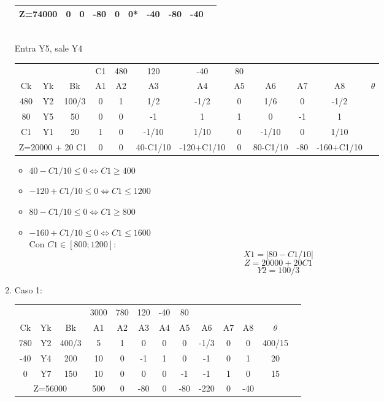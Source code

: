 \documentclass{article}
\begin{document}
\begin{enumerate}
\begin{tabular}{|c  c  c | c  c  c  c  c  c  c  c | c |}
			 \multicolumn{3}{|c|}{Z=74000} & 0 & 0 & -80 & 0 & 0* & -40 & -80 & -40 &\\ \hline
		\end{tabular}
		\medskip\\
		Entra Y5, sale Y4\\
		\begin{tabular}{|c  c  c | c  c  c  c  c  c  c  c | c |}
			\hline
			 \multicolumn{3}{|c|}{} & C1 & 480 & 120 & -40 & 80 & & & &\\ 
			 Ck & Yk & Bk & A1 & A2 & A3 & A4 & A5 & A6 & A7 & A8 & $\theta$\\ \hline 
			 480 & Y2 & 100/3 & 0 & 1 & 1/2 & -1/2 & 0 & 1/6 & 0 & -1/2 & \\
			 80 & Y5 & 50 & 0 & 0 & -1 & 1 & 1 & 0 & -1 & 1 & \\
			 C1 & Y1 & 20 & 1 & 0 & -1/10 & 1/10 & 0 & -1/10 & 0 & 1/10 & \\ \hline
			 \multicolumn{3}{|c|}{Z=20000 + 20 C1} & 0 & 0 & 40-C1/10 & -120+C1/10 & 0 & 80-C1/10 & -80 & -160+C1/10 &\\ \hline
		\end{tabular}
		\begin{itemize}
				\item $40 - C1/10 \leq 0 \iff C1 \geq 400$
				\item $-120 + C1/10 \leq 0 \iff C1 \leq 1200$
				\item $80 - C1/10 \leq 0 \iff C1 \geq 800$
				\item $-160 + C1/10 \leq 0 \iff C1 \leq 1600$
					\smallskip\\
					Con $C1 \in [800; 1200]$:\\
					$$X1 = |80 - C1/10|$$
					$$Z = 20000 + 20 C1$$
					$$Y2 = 100/3$$
		\end{itemize}
	\item Caso 1:\\
		\begin{tabular}{|c  c  c | c  c  c  c  c  c  c  c  c | c |}
			\hline
			 \multicolumn{3}{|c|}{} & 3000 & 780 & 120 & -40 & 80 & & & & \\ 
			 Ck & Yk & Bk & A1 & A2 & A3 & A4 & A5 & A6 & A7 & A8 & $\theta$\\ \hline 
			 780 & Y2 & 400/3 & 5 & 1 & 0 & 0 & 0 & -1/3 & 0 & 0 & 400/15\\
			 -40 & Y4 & 200 & 10 & 0 & -1 & 1 & 0 & -1 & 0 & 1 & 20\\
			 0 & Y7 & 150 & 10 & 0 & 0 & 0 & -1 & -1 & 1 & 0 & 15\\ \hline
			 \multicolumn{3}{|c|}{Z=56000} & 500 & 0 & -80 & 0 & -80 & -220 & 0 & -40\\ \hline

\end{tabular}
\end{enumerate}
\end{document}
